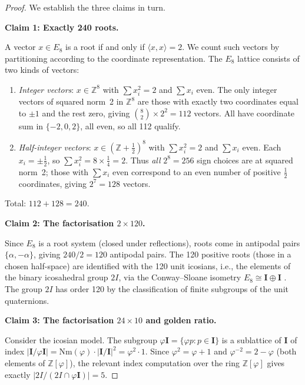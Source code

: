 \begin{proof}
We establish the three claims in turn.

\medskip
\textbf{Claim 1: Exactly 240 roots.}

A vector \(x \in E_8\) is a root if and only if
\(\langle x, x \rangle = 2\).  We count such vectors by partitioning
according to the coordinate representation.  The \(E_8\) lattice
consists of two kinds of vectors:
\begin{enumerate}[label=(\alph*)]
  \item \emph{Integer vectors}: \(x \in \mathbb{Z}^8\) with
    \(\sum x_i^2 = 2\) and \(\sum x_i\) even.  The only integer
    vectors of squared norm~2 in \(\mathbb{Z}^8\) are those with
    exactly two coordinates equal to \(\pm 1\) and the rest zero,
    giving \(\binom{8}{2} \times 2^2 = 112\) vectors.  All have
    coordinate sum in \(\{-2, 0, 2\}\), all even, so all 112
    qualify.
  \item \emph{Half-integer vectors}: \(x \in
    (\mathbb{Z}+\tfrac{1}{2})^8\) with
    \(\sum x_i^2 = 2\) and \(\sum x_i\) even.  Each
    \(x_i = \pm\tfrac{1}{2}\), so \(\sum x_i^2 = 8 \times
    \tfrac{1}{4} = 2\).  Thus \emph{all} \(2^8 = 256\) sign
    choices are at squared norm~2; those with \(\sum x_i\) even
    correspond to an even number of positive \(\tfrac{1}{2}\)
    coordinates, giving \(2^7 = 128\) vectors.
\end{enumerate}

Total: \(112 + 128 = 240\).

\medskip
\textbf{Claim 2: The factorisation \(2 \times 120\).}

Since \(E_8\) is a root system (closed under reflections), roots come
in antipodal pairs \(\{\alpha, -\alpha\}\), giving
\(240 / 2 = 120\) antipodal pairs.  The 120 positive roots (those in
a chosen half-space) are identified with the 120 unit icosians, i.e.,
the elements of the binary icosahedral group \(2I\), via the Conway–Sloane
isometry \(E_8 \cong \mathbf{I} \oplus \mathbf{I}\)
\cite{conway_sphere_packings}.  The group \(2I\) has order 120 by the
classification of finite subgroups of the unit quaternions.

\medskip
\textbf{Claim 3: The factorisation \(24 \times 10\) and golden ratio.}

Consider the icosian model.  The subgroup
\(\varphi \mathbf{I} = \{\varphi p : p \in \mathbf{I}\}\) is a
sublattice of \(\mathbf{I}\) of index \(|\mathbf{I}/\varphi\mathbf{I}|
= \mathrm{Nm}(\varphi) \cdot |\mathbf{I}/\mathbf{I}|^2
= \varphi^2 \cdot 1\).  Since \(\varphi^2 = \varphi + 1\) and
\(\varphi^{-2} = 2 - \varphi\) (both elements of
\(\mathbb{Z}[\varphi]\)), the relevant index computation over the ring
\(\mathbb{Z}[\varphi]\) gives exactly \(|2I / (2I \cap \varphi
\mathbf{I})| = 5\).


\end{proof}
